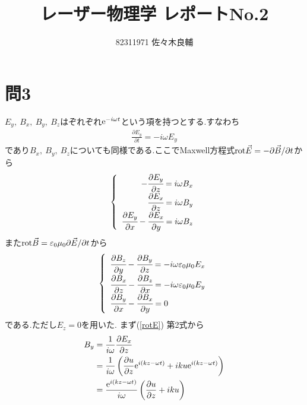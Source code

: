 \documentclass[uplatex,a4j,11pt,dvipdfmx]{jsarticle}
\numberwithin{equation}{section}
\begin{document}
\title{レーザー物理学 レポートNo.2}
\author{82311971 佐々木良輔}
\date{}
\maketitle
\setcounter{section}{3}
\section*{問3}
$E_y,\ B_x,\ B_y,\ B_z$はぞれぞれ${\rm e}^{-i\omega t}$という項を持つとする.すなわち
\begin{align}
  \frac{\partial E_y}{\partial t}=-i\omega E_y
\end{align}
であり$B_x,\ B_y,\ B_z$についても同様である.ここでMaxwell方程式${\rm rot}\vec{E}=-\partial \vec{B}/\partial t$から
\begin{align}
  \label{rotE}
  \left\{
    \begin{array}[1]{r}
        -\cfrac{\partial E_y}{\partial z}=i\omega B_x\\
        \cfrac{\partial E_x}{\partial z}=i\omega B_y\\
        \cfrac{\partial E_y}{\partial x}-\cfrac{\partial E_x}{\partial y}=i\omega B_z
    \end{array}
  \right.
\end{align}
また${\rm rot}\vec{B}=\varepsilon_0\mu_0\partial \vec{E}/\partial t$から
\begin{align}
  \label{rotB}
  \left\{
    \begin{array}[1]{l}
      \cfrac{\partial B_z}{\partial y}-\cfrac{\partial B_y}{\partial z}=-i\omega\varepsilon_0\mu_0E_x\\
      \cfrac{\partial B_x}{\partial z}-\cfrac{\partial B_z}{\partial x}=-i\omega\varepsilon_0\mu_0E_y\\
      \cfrac{\partial B_y}{\partial x}-\cfrac{\partial B_x}{\partial y}=0
    \end{array}
  \right.
\end{align}
である.ただし$E_z=0$を用いた.
まず(\ref{rotE}) 第2式から
\begin{align}
  \label{By}
  \begin{split}
    B_y
    &=\frac{1}{i\omega}\frac{\partial E_x}{\partial z}\\
    &=\frac{1}{i\omega}\left(\frac{\partial u}{\partial z}{\rm e}^{i(kz-\omega t)}+iku{\rm e}^{i(kz-\omega t)}\right)\\
    &=\frac{{\rm e}^{i(kz-\omega t)}}{i\omega}\left(\frac{\partial u}{\partial z}+iku\right)
  \end{split}
\end{align}
\end{document}
